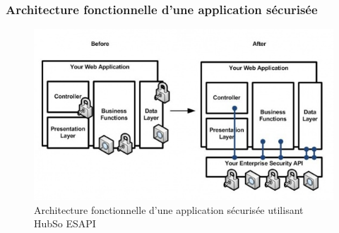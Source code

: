\subsubsection{Architecture fonctionnelle d'une application sécurisée}
\begin{figure}[H]
	\centering
	\begin{minipage}{12cm}
		\centering
		\includegraphics[width=0.7\linewidth]{parts/part04/chapters/conception/fig/archi.jpg}
	\end{minipage}
	\caption{Architecture fonctionnelle d'une application sécurisée utilisant HubSo ESAPI}
	\label{fig:architecturefonctionnellehubsoesapi}
\end{figure}


